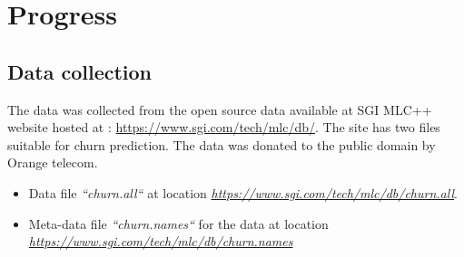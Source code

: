 \setlength{\footskip}{8mm}

\chapter{Progress}
\label{ch:dpdd}

\section{Data collection}
The data was collected from the open source data available at SGI MLC++ website hosted at : \url{https://www.sgi.com/tech/mlc/db/}. The site has two files suitable for churn prediction. The data was donated to the public domain by Orange telecom.
\begin{itemize}
	\item Data file \textit{``churn.all``} at location  \textit{\url{https://www.sgi.com/tech/mlc/db/churn.all}}.
	\item Meta-data file \textit{``churn.names``} for the data at location \textit{\url{https://www.sgi.com/tech/mlc/db/churn.names}}
\end{itemize}

